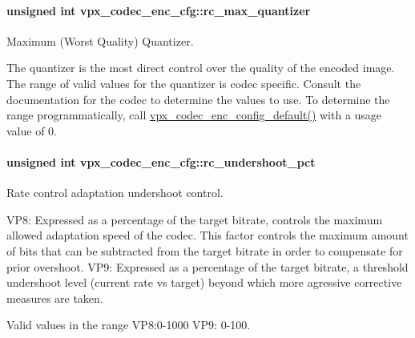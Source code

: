\paragraph[{\texorpdfstring{rc\+\_\+max\+\_\+quantizer}{rc_max_quantizer}}]{\setlength{\rightskip}{0pt plus 5cm}unsigned int vpx\+\_\+codec\+\_\+enc\+\_\+cfg\+::rc\+\_\+max\+\_\+quantizer}\hypertarget{structvpx__codec__enc__cfg_a8abdd985d317b720e142335887d737df}{}\label{structvpx__codec__enc__cfg_a8abdd985d317b720e142335887d737df}


Maximum (Worst Quality) Quantizer. 

The quantizer is the most direct control over the quality of the encoded image. The range of valid values for the quantizer is codec specific. Consult the documentation for the codec to determine the values to use. To determine the range programmatically, call \hyperlink{group__encoder_ga6cf8d0bbb663cd4df3a78d9eeb3bfb0e}{vpx\+\_\+codec\+\_\+enc\+\_\+config\+\_\+default()} with a usage value of 0. 
\paragraph[{\texorpdfstring{rc\+\_\+undershoot\+\_\+pct}{rc_undershoot_pct}}]{\setlength{\rightskip}{0pt plus 5cm}unsigned int vpx\+\_\+codec\+\_\+enc\+\_\+cfg\+::rc\+\_\+undershoot\+\_\+pct}\hypertarget{structvpx__codec__enc__cfg_ad279fbb0a9fe9395340913161e28651a}{}\label{structvpx__codec__enc__cfg_ad279fbb0a9fe9395340913161e28651a}


Rate control adaptation undershoot control. 

V\+P8\+: Expressed as a percentage of the target bitrate, controls the maximum allowed adaptation speed of the codec. This factor controls the maximum amount of bits that can be subtracted from the target bitrate in order to compensate for prior overshoot. V\+P9\+: Expressed as a percentage of the target bitrate, a threshold undershoot level (current rate vs target) beyond which more agressive corrective measures are taken.
\begin{DoxyItemize}
\item Valid values in the range V\+P8\+:0-\/1000 V\+P9\+: 0-\/100. 
\end{DoxyItemize}
